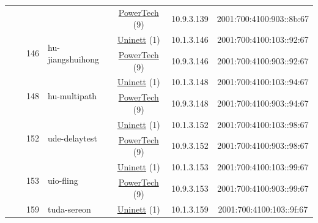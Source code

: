 \begin{small}
\begin{center}
\begin{longtable}{|c|c|c|c|c|c|c|c|}
  &  &  &  & \multicolumn{2}{|c|}{\tiny{\href{http://www.powertech.no}{PowerTech} (9)}} & \tiny{10.9.3.139} & \tiny{2001:700:4100:903::8b:67} \\* \cline{3-3}\cline{4-4}\cline{5-5}\cline{6-6}\cline{7-7}\cline{8-8}
  &  & \multirow{2}{*}{\tiny{146}} & \multicolumn{1}{|l|}{\multirow{2}{*}{\tiny{hu-jiangshuihong}}} & \multicolumn{2}{|c|}{\tiny{\href{https://www.uninett.no}{Uninett} (1)}} & \tiny{10.1.3.146} & \tiny{2001:700:4100:103::92:67} \\* \cline{5-5}\cline{6-6}\cline{7-7}\cline{8-8}
  &  &  &  & \multicolumn{2}{|c|}{\tiny{\href{http://www.powertech.no}{PowerTech} (9)}} & \tiny{10.9.3.146} & \tiny{2001:700:4100:903::92:67} \\* \cline{3-3}\cline{4-4}\cline{5-5}\cline{6-6}\cline{7-7}\cline{8-8}
  &  & \multirow{2}{*}{\tiny{148}} & \multicolumn{1}{|l|}{\multirow{2}{*}{\tiny{hu-multipath}}} & \multicolumn{2}{|c|}{\tiny{\href{https://www.uninett.no}{Uninett} (1)}} & \tiny{10.1.3.148} & \tiny{2001:700:4100:103::94:67} \\* \cline{5-5}\cline{6-6}\cline{7-7}\cline{8-8}
  &  &  &  & \multicolumn{2}{|c|}{\tiny{\href{http://www.powertech.no}{PowerTech} (9)}} & \tiny{10.9.3.148} & \tiny{2001:700:4100:903::94:67} \\* \cline{3-3}\cline{4-4}\cline{5-5}\cline{6-6}\cline{7-7}\cline{8-8}
  &  & \multirow{2}{*}{\tiny{152}} & \multicolumn{1}{|l|}{\multirow{2}{*}{\tiny{ude-delaytest}}} & \multicolumn{2}{|c|}{\tiny{\href{https://www.uninett.no}{Uninett} (1)}} & \tiny{10.1.3.152} & \tiny{2001:700:4100:103::98:67} \\* \cline{5-5}\cline{6-6}\cline{7-7}\cline{8-8}
  &  &  &  & \multicolumn{2}{|c|}{\tiny{\href{http://www.powertech.no}{PowerTech} (9)}} & \tiny{10.9.3.152} & \tiny{2001:700:4100:903::98:67} \\* \cline{3-3}\cline{4-4}\cline{5-5}\cline{6-6}\cline{7-7}\cline{8-8}
  &  & \multirow{2}{*}{\tiny{153}} & \multicolumn{1}{|l|}{\multirow{2}{*}{\tiny{uio-fling}}} & \multicolumn{2}{|c|}{\tiny{\href{https://www.uninett.no}{Uninett} (1)}} & \tiny{10.1.3.153} & \tiny{2001:700:4100:103::99:67} \\* \cline{5-5}\cline{6-6}\cline{7-7}\cline{8-8}
  &  &  &  & \multicolumn{2}{|c|}{\tiny{\href{http://www.powertech.no}{PowerTech} (9)}} & \tiny{10.9.3.153} & \tiny{2001:700:4100:903::99:67} \\* \cline{3-3}\cline{4-4}\cline{5-5}\cline{6-6}\cline{7-7}\cline{8-8}
  &  & \multirow{2}{*}{\tiny{159}} & \multicolumn{1}{|l|}{\multirow{2}{*}{\tiny{tuda-sereon}}} & \multicolumn{2}{|c|}{\tiny{\href{https://www.uninett.no}{Uninett} (1)}} & \tiny{10.1.3.159} & \tiny{2001:700:4100:103::9f:67} \\* \cline{5-5}\cline{6-6}\cline{7-7}\cline{8-8}

\end{longtable}
\end{center}
\end{small}
